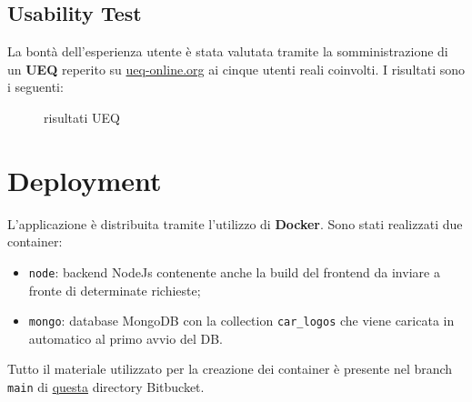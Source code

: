 \documentclass{report}
\begin{document}
\subsection{Usability Test}
La bontà dell'esperienza utente è stata valutata tramite la somministrazione di un \textbf{UEQ} reperito su \href{https://www.ueq-online.org}{ueq-online.org} ai cinque utenti reali coinvolti. I risultati sono i seguenti:
\begin{figure}[H]
    \centering
  \caption{risultati UEQ}
\end{figure}
\newpage
\section{Deployment}
L'applicazione è distribuita tramite l'utilizzo di \textbf{Docker}. Sono stati realizzati due container:
\begin{itemize}
    \item \texttt{node}: backend NodeJs contenente anche la build del frontend da inviare a fronte di determinate richieste;
    \item \texttt{mongo}: database MongoDB con la collection \texttt{car\_logos} che viene caricata in automatico al primo avvio del DB.
\end{itemize}
Tutto il materiale utilizzato per la creazione dei container è presente nel branch \texttt{main} di \href{https://davprs@bitbucket.org/davprs/anti-theft-system-for-vehicle.git}{questa} directory Bitbucket.
\end{document}
